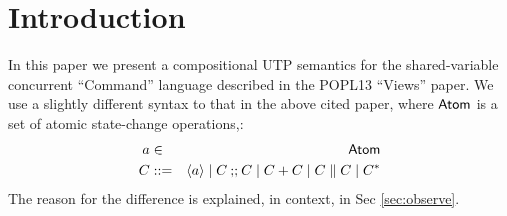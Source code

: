 \section{Introduction}\label{sec:Intro}

In this paper we present a compositional UTP semantics
for the shared-variable concurrent ``Command'' language described
in the POPL13 ``Views'' paper\cite{conf/popl/Dinsdale-YoungBGPY13}.
We use a slightly different syntax to that in the above cited paper,
where $\textsf{Atom}$ is a set of atomic state-change operations,:
\begin{eqnarray*}
   a &\in& \textsf{Atom}
\\ C &::=& \langle a\rangle \mid C \mathbin{;\!;} C \mid C+C \mid C \parallel C \mid C^*
\end{eqnarray*}
The reason for the difference is explained, in context, in Sec \ref{sec:observe}.




